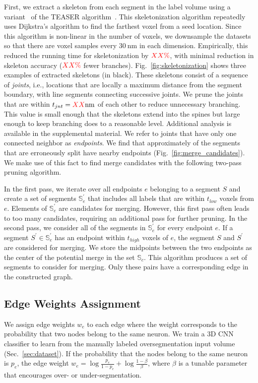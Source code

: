 First, we extract a skeleton from each segment in the label volume using a variant~\cite{zhao2014automatic} of the TEASER algorithm~\cite{sato2000teasar}. 
This skeletonization algorithm repeatedly uses Dijkstra's algorithm to find the farthest voxel from a seed location. 
Since this algorithm is non-linear in the number of voxels, we downsample the datasets so that there are voxel samples every $\SI{30}{\nano\meter}$ in each dimension.
Empirically, this reduced the running time for skeletonization by $\textcolor{red}{XX\%}$, with minimal reduction in skeleton accuracy ($\textcolor{red}{XX\%}$ fewer branches). 
Fig.~\ref{fig:skeletonization} shows three examples of extracted skeletons (in black). 
These skeletons consist of a sequence of \textit{joints}, i.e., locations that are locally a maximum distance from the segment boundary, with line segments connecting successive joints. 
We prune the joints that are within $t_{jnt} = \textcolor{red}{XX}\SI{}{\nano\meter}$ of each other to reduce unnecessary branching.
This value is small enough that the skeletons extend into the spines but large enough to keep branching does to a reasonable level.
Additional analysis is available in the supplemental material.
We refer to joints that have only one connected neighbor as \textit{endpoints}. 
We find that approximately  of the segments that are erroneously split have nearby endpoints  (Fig.~\ref{fig:merge_candidates}). 
We make use of this fact to find merge candidates with the following two-pass pruning algorithm.

In the first pass, we iterate over all endpoints $e$ belonging to a segment $S$ and create a set of segments $\mathbb{S}_e^\prime$ that includes all labels that are within $t_{low}$ voxels from $e$.
Elements of $\mathbb{S}_e^\prime$ are candidates for merging. 
However, this first pass often leads to too many candidates, requiring an additional pass for further pruning. 
In the second pass, we consider all of the segments in $\mathbb{S}_e^\prime$ for every endpoint $e$. 
If a segment $S^\prime \in \mathbb{S}_e^\prime$ has an endpoint within $t_{high}$ voxels of $e$, the segment $S$ and $S^\prime$ are considered for merging. 
We store the midpoints between the two endpoints as the center of the potential merge in the set $\mathbb{S}_c$. 
This algorithm produces a set of segments to consider for merging. Only these pairs have a corresponding edge in the constructed graph.


\subsection{Edge Weights Assignment}
\label{sec:edge-weights}
We assign edge weights $w_e$ to each edge where the weight corresponds to the probability that two nodes belong to the same neuron.
We train a 3D CNN classifier to learn from the manually labeled oversegmentation input volume (Sec.~\ref{sec:dataset}).
If the probability that the nodes belong to the same neuron is $p_e$, the edge weight $w_e = \log{\frac{p_e}{1 - p_e}} + \log{\frac{1 - \beta}{\beta}}$, where $\beta$ is a tunable parameter that encourages over- or under-segmentation.

